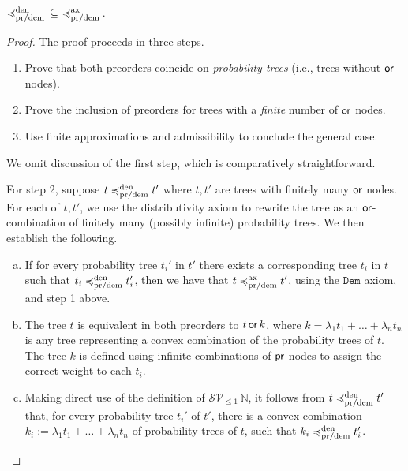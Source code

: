 \begin{lemma}
${\preccurlyeq^{\text{den}}_{\text{pr/dem}}} \, \subseteq \, \, \preccurlyeq^{\text{ax}}_{\text{pr/dem}}\,$.
\end{lemma}
\begin{proof}
The proof proceeds in three steps.
    \begin{enumerate}
        \item Prove that both preorders coincide 
            on \emph{probability trees} (i.e., trees without $\operatorname{\textsf{or}}$ nodes).
        \item Prove the inclusion of preorders for
             trees with a \emph{finite} number 
            of $\operatorname{\textsf{or}}$ nodes.
        \item Use finite approximations and admissibility
            to conclude the general case.
    \end{enumerate}

We omit discussion of the first step, which  is comparatively straightforward.

For step 2, suppose $t \preccurlyeq^{\text{den}}_{\text{pr/dem}} t'$ where $t,t'$ are 
trees with finitely many $\operatorname{\textsf{or}}$ nodes. For each of $t, t'$, we use the distributivity axiom to rewrite the tree
          as an $\operatorname{\textsf{or}}$-combination of finitely many (possibly infinite) {probability trees}. We then establish the following.
    \begin{enumerate}[(a)]
         \item 
            If for every 
            probability
            tree $t_i'$ in $t'$ there exists 
            a corresponding tree $t_i$ in $t$ 
            such that $t_i \preccurlyeq^{\text{den}}_{\text{pr/dem}} t_i'$,
            then we have that $t \preccurlyeq^{\text{ax}}_{\text{pr/dem}} t'$, using the $\texttt{Dem}$ axiom, and  step 1 above.

        \item 
            The tree $t$ is equivalent  in both preorders  to 
            $t \operatorname{\textsf{or}} k$, where $k = \lambda_1t_1+ \dots + \lambda_n t_n$
            is any tree representing a convex combination of the probability trees of $t$.
            The tree $k$ is defined  using infinite combinations of $\operatorname{\textsf{pr}}$ nodes to assign the correct weight to each $t_i$.
    
        \item Making direct use of the definition of $\mathcal{S}\mathcal{V}_{\leq 1}\, \mathbb{N}$, it follows from $t \preccurlyeq^{\text{den}}_{\text{pr/dem}} t'$ that, for every
            probability tree   $t_i'$ of $t'$,
            there is a convex combination
            $k_i := \lambda_1t_1+ \dots + \lambda_n t_n$
            of probability trees of $t$,
                        such that $k_i \preccurlyeq^{\text{den}}_{\text{pr/dem}} t_i'$.



\end{enumerate}
\end{proof}
